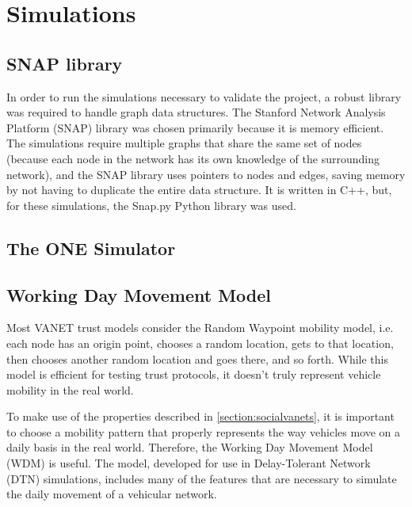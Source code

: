 \chapter{Simulations}
\label{chap:simulations}

\section{SNAP library}
\label{section:snap}
In order to run the simulations necessary to validate the project, a robust library was required to handle graph data structures.
The Stanford Network Analysis Platform (SNAP) library \cite{snap} was chosen primarily because it is memory efficient.
The simulations require multiple graphs that share the same set of nodes (because each node in the network has its own knowledge of the surrounding network), and the SNAP library uses pointers to nodes and edges, saving memory by not having to duplicate the entire data structure.
It is written in C++, but, for these simulations, the Snap.py Python library was used.


\section{The ONE Simulator}
\label{section:theone}

\section{Working Day Movement Model}
\label{section:workingday}

Most VANET trust models consider the Random Waypoint mobility model, i.e. each node has an origin point, chooses a random location, gets to that location, then chooses another random location and goes there, and so forth.
While this model is efficient for testing trust protocols, it doesn't truly represent vehicle mobility in the real world.

To make use of the properties described in \autoref{section:socialvanets}, it is important to choose a mobility pattern that properly represents the way vehicles move on a daily basis in the real world.
Therefore, the Working Day Movement Model \cite{ekman2008working} (WDM) is useful.
The model, developed for use in Delay-Tolerant Network (DTN) simulations, includes many of the features that are necessary to simulate the daily movement of a vehicular network.

